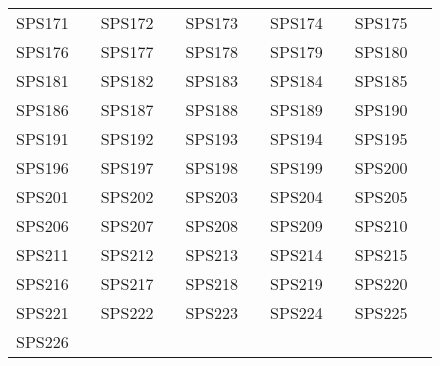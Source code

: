 \begin{table*}[htbp]
\begin{tabularx}{\textwidth}{c>{\centering\arraybackslash}X c>{\centering\arraybackslash}X c>{\centering\arraybackslash}X c>{\centering\arraybackslash}X c>{\centering\arraybackslash}X}
SPS171 & \cite{171} & SPS172 & \cite{172} & SPS173 & \cite{173} & SPS174 & \cite{174} & SPS175 & \cite{175} \\
SPS176 & \cite{176} & SPS177 & \cite{177} & SPS178 & \cite{178} & SPS179 & \cite{179} & SPS180 & \cite{180} \\
SPS181 & \cite{181} & SPS182 & \cite{182} & SPS183 & \cite{183} & SPS184 & \cite{184} & SPS185 & \cite{185} \\
SPS186 & \cite{186} & SPS187 & \cite{187} & SPS188 & \cite{188} & SPS189 & \cite{189} & SPS190 & \cite{190} \\
SPS191 & \cite{191} & SPS192 & \cite{192} & SPS193 & \cite{193} & SPS194 & \cite{194} & SPS195 & \cite{195} \\
SPS196 & \cite{196} & SPS197 & \cite{197} & SPS198 & \cite{198} & SPS199 & \cite{199} & SPS200 & \cite{200} \\
SPS201 & \cite{201} & SPS202 & \cite{202} & SPS203 & \cite{203} & SPS204 & \cite{204} & SPS205 & \cite{205} \\
SPS206 & \cite{206} & SPS207 & \cite{207} & SPS208 & \cite{208} & SPS209 & \cite{209} & SPS210 & \cite{210} \\
SPS211 & \cite{211} & SPS212 & \cite{212} & SPS213 & \cite{213} & SPS214 & \cite{214} & SPS215 & \cite{215} \\
SPS216 & \cite{216} & SPS217 & \cite{217} & SPS218 & \cite{218} & SPS219 & \cite{219} & SPS220 & \cite{220} \\
SPS221 & \cite{221} & SPS222 & \cite{222} & SPS223 & \cite{223} & SPS224 & \cite{224} & SPS225 & \cite{225} \\
SPS226 & \cite{226} \\
\hline
\end{tabularx}
\end{table*}